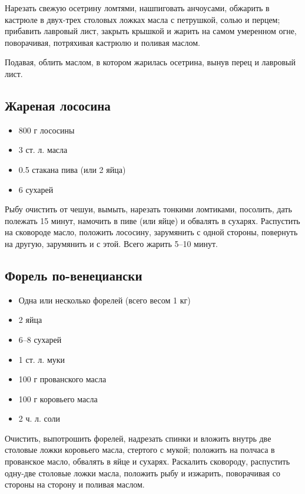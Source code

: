 Нарезать свежую осетрину ломтями, нашпиговать анчоусами, обжарить в кастрюле в двух-трех столовых ложках масла с петрушкой, солью и перцем; прибавить лавровый лист, закрыть крышкой и жарить на самом умеренном огне, поворачивая, потряхивая кастрюлю и поливая маслом.

Подавая, облить маслом, в котором жарилась осетрина, вынув перец и лавровый лист.

\subsection{Жареная лососина}

\begin{itemize} 
	\item  800 г лососины 
    \item  3 ст. л. масла 
    \item  0.5 стакана пива (или 2 яйца) 
    \item  6 сухарей
\end{itemize}

Рыбу очистить от чешуи, вымыть, нарезать тонкими ломтиками, посолить, дать полежать 15 минут, намочить в пиве (или яйце) и обвалять в сухарях. Распустить на сковороде масло, положить лососину, зарумянить с одной стороны, повернуть на другую, зарумянить и с этой. Всего жарить 5–10 минут.

\subsection{Форель по-венециански}

\begin{itemize} 
	\item  Одна или несколько форелей (всего весом 1 кг) 
    \item  2 яйца 
    \item  6–8 сухарей 
    \item  1 ст. л. муки 
    \item  100 г прованского масла 
    \item  100 г коровьего масла 
    \item  2 ч. л. соли
\end{itemize}

Очистить, выпотрошить форелей, надрезать спинки и вложить внутрь две столовые ложки коровьего масла, стертого с мукой; положить на полчаса в прованское масло, обвалять в яйце и сухарях. Раскалить сковороду, распустить одну-две столовые ложки масла, положить рыбу и изжарить, поворачивая со стороны на сторону и поливая маслом.


